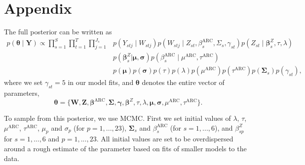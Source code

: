 \documentclass[12pt]{article}
\def\bbeta{\pmb{\beta}}
\def\bgamma{\pmb{\gamma}}
\def\bmu{\pmb{\mu}}
\def\bsigma{\pmb{\sigma}}
\def\bSigma{\pmb{\Sigma}}
\def\btheta{\pmb{\theta}}
\def\bY{\pmb{Y}}
\def\bZ{\pmb{Z}}
\def\bW{\pmb{W}}
\begin{document}



\newpage
\small\normalsize
%




\newpage
\section{Appendix}

The full posterior can be written as
\begin{align*}
p(\btheta \mid \bY) \propto \prod_{s = 1}^S \prod_{t = 1}^T \prod_{j = 1}^{J_s} & p(Y_{stj} \mid W_{stj}) p(W_{stj} \mid Z_{st}, \beta_s^\text{ARC}, \Sigma_s, \gamma_{st}) p(Z_{st} \mid \bbeta_s^Z, \tau, \lambda) \\
& p(\bbeta_s^Z | \bmu, \bsigma) p(\beta_s^\text{ARC} \mid \mu^\text{ARC}, \tau^\text{ARC}) \\
& p(\bmu) p(\bsigma) p(\tau) p(\lambda) p(\mu^\text{ARC}) p(\tau^\text{ARC}) p(\bSigma_s) p(\gamma_{st}),
\end{align*}
where we set $\gamma_{st} = 5$ in our model fits, and $\btheta$ denotes the entire vector of parameters, 
$$
\btheta = \{\bW, \bZ, \bbeta^\text{ARC}, \bSigma, \bgamma, \bbeta^Z, \tau, \lambda, \bmu, \bsigma, \mu^\text{ARC}, \tau^\text{ARC}\}.
$$

To sample from this posterior, we use MCMC. First we set initial values of $\lambda$, $\tau$, $\mu^\text{ARC}$, $\tau^\text{ARC}$, $\mu_p$ and $\sigma_p$ (for $p = 1, ..., 23$), $\bSigma_s$ and $\beta_s^\text{ARC}$ (for $s = 1, ..., 6$), and $\beta^Z_{sp}$ for $s = 1, ..., 6$ and $p = 1, ..., 23$. All initial values are set to be overdispersed around a rough estimate of the parameter based on fits of smaller models to the data.
\end{document}
